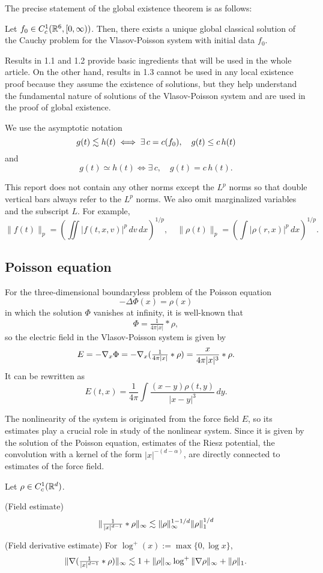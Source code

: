 \documentclass[11pt]{amsart}
\begin{document}
The precise statement of the global existence theorem is as follows:
\begin{thm}
Let $f_0\in C_c^1(\mathbb{R}^6,[0,\infty))$.
Then, there exists a unique global classical solution of the Cauchy problem for the Vlasov-Poisson system with initial data $f_0$.
\end{thm}

Results in 1.1 and 1.2 provide basic ingredients that will be used in the whole article.
On the other hand, results in 1.3 cannot be used in any local existence proof because they assume the existence of solutions, but they help understand the fundamental nature of solutions of the Vlasov-Poisson system and are used in the proof of global existence.

\begin{notn*}
We use the asymptotic notation
\[g(t)\lesssim h(t)\iff\exists\,c=c(f_0),\quad g(t)\le c\,h(t)\]
and
\[g(t)\simeq h(t)\iff\exists\,c,\quad g(t)=c\,h(t).\]

This report does not contain any other norms except the $L^p$ norms so that double vertical bars always refer to the $L^p$ norms.
We also omit marginalized variables and the subscript $L$.
For example,
\[\|f(t)\|_p=(\iint|f(t,x,v)|^p\,dv\,dx)^{1/p},\quad\|\rho(t)\|_p=(\int|\rho(r,x)|^p\,dx)^{1/p}.\]
\end{notn*}



\subsection{Poisson equation}
For the three-dimensional boundaryless problem of the Poisson equation
\[-\Delta\Phi(x)=\rho(x)\]
in which the solution $\Phi$ vanishes at infinity, it is well-known that
\[\Phi=\tfrac1{4\pi|x|}*\rho,\]
so the electric field in the Vlasov-Poisson system is given by
\[E=-\nabla_x\Phi=-\nabla_x(\tfrac1{4\pi|x|}*\rho)=\frac{x}{4\pi|x|^3}*\rho.\]
It can be rewritten as
\[E(t,x)=\frac1{4\pi}\int\frac{(x-y)\rho(t,y)}{|x-y|^3}\,dy.\]

The nonlinearity of the system is originated from the force field $E$, so its estimates play a crucial role in study of the nonlinear system.
Since it is given by the solution of the Poisson equation, estimates of the Riesz potential, the convolution with a kernel of the form $|x|^{-(d-\alpha)}$, are directly connected to estimates of the force field.

\begin{lem}
Let $\rho\in C_c^1(\mathbb{R}^d)$.
\begin{cond}
\item(Field estimate)
\[\|\tfrac1{|x|^{d-1}}*\rho\|_\infty\lesssim\|\rho\|_\infty^{1-1/d}\|\rho\|_1^{1/d}\]
\item(Field derivative estimate)
For $\log^+(x):=\max\{0,\log x\}$,
\[\|\nabla(\tfrac1{|x|^{d-1}}*\rho)\|_\infty\lesssim1+\|\rho\|_\infty\log^+\|\nabla\rho\|_\infty+\|\rho\|_1.\]
\end{cond}
\end{lem}
\end{document}
